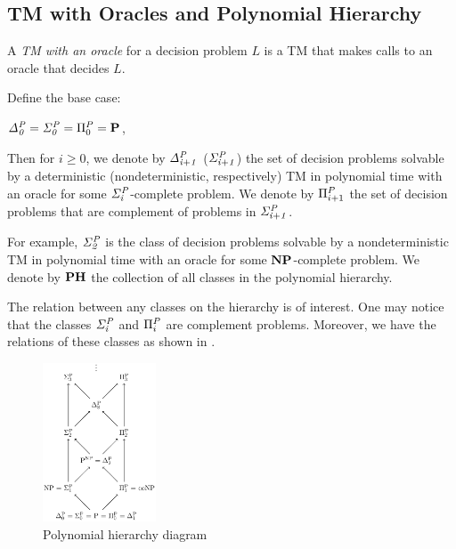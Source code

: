 \subsection{TM with Oracles and Polynomial Hierarchy}
A \textit{TM with an oracle} for a decision problem $L$ is a TM that makes calls 
to an oracle that decides $L$.

\begin{definition}
	Define the base case:
	\begin{center}
		$\mathit{\Delta^P_{0}} = \mathit{\Sigma^P_{0}} = \Pi^P_{0} = \textbf{P}$,
	\end{center}
	Then for $i \geq 0$, we denote by $\mathit{\Delta^P_{i+1}}$ ($\mathit{\Sigma^P_{i+1}}$) 
	the set of decision problems solvable
	by a deterministic (nondeterministic, respectively) TM 
	in polynomial time with an oracle for some $\mathit{\Sigma^P_{i}}$-complete problem.
	We denote by $\Pi^P_{i+1}$ the set of decision problems that are complement
	of problems in $\mathit{\Sigma^P_{i+1}}$.
\end{definition}
For example, $\mathit{\Sigma^P_{2}}$ is the class of decision problems solvable by a nondeterministic
TM in polynomial time with an oracle for some $\textbf{NP}$-complete problem.
We denote by $\textbf{PH}$ the collection of all classes in the polynomial hierarchy.

The relation between any classes on the hierarchy is of interest.
One may notice that the classes $\mathit{\Sigma^P_{i}}$ and $\Pi^P_{i}$ are
complement problems.
Moreover, we have the relations of these classes as shown in .

\begin{figure}[h!]
  \centering
  \includegraphics[width=0.3\textwidth]{img/ph_diagram.png}
  \caption{Polynomial hierarchy diagram \label{fig:ph_diagram}}
\end{figure}

